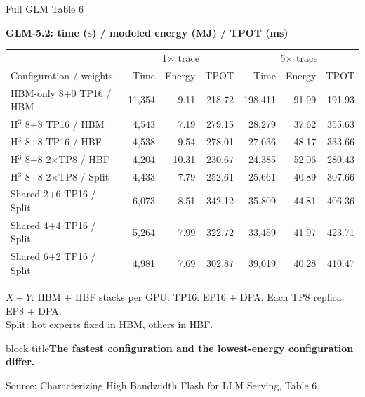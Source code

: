 \documentclass[aspectratio=169,10pt]{beamer}
\newcommand{\takeaway}[1]{\par\vspace{.12cm}\begin{beamercolorbox}[rounded=true,sep=.12cm,wd=\linewidth]{block title}\small\bfseries #1\end{beamercolorbox}}
\newcommand{\src}[1]{\par\vfill{\fontsize{7}{8}\selectfont\color{Muted}Source: Characterizing High Bandwidth Flash for LLM Serving, #1.}\par}
\newcommand{\head}[1]{\par{\color{Accent}\bfseries #1}\par\smallskip}
\renewcommand{\arraystretch}{1.15}
\begin{document}
\begin{frame}[t]{Full GLM Table 6}

\small
\head{GLM-5.2: time (s) / modeled energy (MJ) / TPOT (ms)}
\setlength{\tabcolsep}{4pt}\renewcommand{\arraystretch}{1.05}
\begin{tabularx}{\textwidth}{@{}Xrrrrrr@{}}\toprule
&\multicolumn{3}{c}{1$\times$ trace}&\multicolumn{3}{c}{5$\times$ trace}\\
Configuration / weights&Time&Energy&TPOT&Time&Energy&TPOT\\\midrule
HBM-only 8+0 TP16 / HBM&11,354&9.11&218.72&198,411&91.99&191.93\\
H$^3$ 8+8 TP16 / HBM&4,543&7.19&279.15&28,279&37.62&355.63\\
H$^3$ 8+8 TP16 / HBF&4,538&9.54&278.01&27,036&48.17&333.66\\
H$^3$ 8+8 2$\times$TP8 / HBF&4,204&10.31&230.67&24,385&52.06&280.43\\
H$^3$ 8+8 2$\times$TP8 / Split&4,433&7.79&252.61&25,661&40.89&307.66\\
Shared 2+6 TP16 / Split&6,073&8.51&342.12&35,809&44.81&406.36\\
Shared 4+4 TP16 / Split&5,264&7.99&322.72&33,459&41.97&423.71\\
Shared 6+2 TP16 / Split&4,981&7.69&302.87&39,019&40.28&410.47\\\bottomrule
\end{tabularx}
\par\vspace{.08cm}
$X+Y$: HBM + HBF stacks per GPU. TP16: EP16 + DPA. Each TP8 replica: EP8 + DPA.\\[.12cm]
Split: hot experts fixed in HBM, others in HBF.
\takeaway{The fastest configuration and the lowest-energy configuration differ.}

\src{Table 6}
\end{frame}
\end{document}
